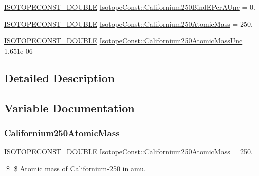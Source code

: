 \begin{DoxyCompactItemize}
\item 
\mbox{\hyperlink{group___isotope_const-_macros_ga8f45a7272ce02c0b4c65c44636ed719a}{I\+S\+O\+T\+O\+P\+E\+C\+O\+N\+S\+T\+\_\+\+D\+O\+U\+B\+LE}} \mbox{\hyperlink{group___isotope_const-_californium-_cf250_gaee2e8784e18ab3478fd32d97995ee31e}{Isotope\+Const\+::\+Californium250\+Bind\+E\+Per\+A\+Unc}} = 0.
\item 
\mbox{\hyperlink{group___isotope_const-_macros_ga8f45a7272ce02c0b4c65c44636ed719a}{I\+S\+O\+T\+O\+P\+E\+C\+O\+N\+S\+T\+\_\+\+D\+O\+U\+B\+LE}} \mbox{\hyperlink{group___isotope_const-_californium-_cf250_ga7d9a69dc7c7c596ed2895ea65e3ef116}{Isotope\+Const\+::\+Californium250\+Atomic\+Mass}} = 250.
\item 
\mbox{\hyperlink{group___isotope_const-_macros_ga8f45a7272ce02c0b4c65c44636ed719a}{I\+S\+O\+T\+O\+P\+E\+C\+O\+N\+S\+T\+\_\+\+D\+O\+U\+B\+LE}} \mbox{\hyperlink{group___isotope_const-_californium-_cf250_ga89239d8acb3fb70585736b49fdb53e20}{Isotope\+Const\+::\+Californium250\+Atomic\+Mass\+Unc}} = 1.\+651e-\/06
\end{DoxyCompactItemize}


\subsection{Detailed Description}


\subsection{Variable Documentation}
\mbox{\label{group___isotope_const-_californium-_cf250_ga7d9a69dc7c7c596ed2895ea65e3ef116}} 
\subsubsection{\texorpdfstring{Californium250\+Atomic\+Mass}{Californium250AtomicMass}}
{\footnotesize\ttfamily \mbox{\hyperlink{group___isotope_const-_macros_ga8f45a7272ce02c0b4c65c44636ed719a}{I\+S\+O\+T\+O\+P\+E\+C\+O\+N\+S\+T\+\_\+\+D\+O\+U\+B\+LE}} Isotope\+Const\+::\+Californium250\+Atomic\+Mass = 250.}

\$ \$ Atomic mass of Californium-\/250 in amu. \mbox{\label{group___isotope_const-_californium-_cf250_ga89239d8acb3fb70585736b49fdb53e20}} 
